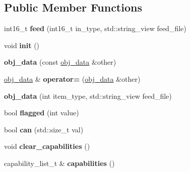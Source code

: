 \subsection*{Public Member Functions}
\begin{DoxyCompactItemize}
\item 
\mbox{\label{structobj__data_a3d7da4441c8008b81092e8382bbcff35}} 
int16\+\_\+t {\bfseries feed} (int16\+\_\+t in\+\_\+type, std\+::string\+\_\+view feed\+\_\+file)
\item 
\mbox{\label{structobj__data_a14f475c7d4aa30563cacad1229a1f654}} 
void {\bfseries init} ()
\item 
\mbox{\label{structobj__data_aa1788a59d6b458a141dd5c63d19b3ecf}} 
{\bfseries obj\+\_\+data} (const \hyperlink{structobj__data}{obj\+\_\+data} \&other)
\item 
\mbox{\label{structobj__data_aef8b0442976e05a1e4967d8a63565d71}} 
\hyperlink{structobj__data}{obj\+\_\+data} \& {\bfseries operator=} (\hyperlink{structobj__data}{obj\+\_\+data} \&other)
\item 
\mbox{\label{structobj__data_aa64aa8b7829789988220521123aa7d7a}} 
{\bfseries obj\+\_\+data} (int item\+\_\+type, std\+::string\+\_\+view feed\+\_\+file)
\item 
\mbox{\label{structobj__data_ab87c2b9c4cee66d19853733c5919caba}} 
bool {\bfseries flagged} (int value)
\item 
\mbox{\label{structobj__data_afc408145d963e0014301a55b77063900}} 
bool {\bfseries can} (std\+::size\+\_\+t val)
\item 
\mbox{\label{structobj__data_a3b74355068b8924a0c3b67c339597bed}} 
void {\bfseries clear\+\_\+capabilities} ()
\item 
\mbox{\label{structobj__data_a707a4e8ebf545b2a926acdf9f9d9b89e}} 
capability\+\_\+list\+\_\+t \& {\bfseries capabilities} ()
\item 
\mbox{\label{structobj__data_a141a2566b61bc97e6acc945ece2a2705}} 

\end{DoxyCompactItemize}
